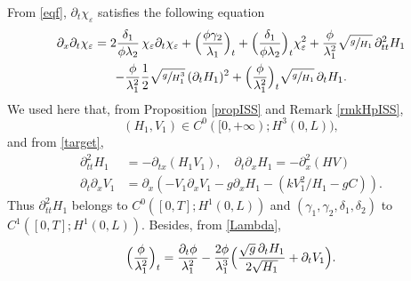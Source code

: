 \documentclass[11pt]{article}
\numberwithin{equation}{section}
\theoremstyle{definition}
\begin{document}
From \eqref{eqf},
$\partial_{t}\chi_{\varepsilon}$ satisfies the following equation
\begin{multline}
\label{eqdtf}
\partial_{x}\partial_{t}\chi_{\varepsilon}=2\frac{\delta_{1}}{\phi\lambda_{2}}\,\chi_{\varepsilon}\partial_{t}\chi_{\varepsilon}+\Bigl(\frac{\phi\gamma_{2}}{\lambda_{1}} \Bigr)_{t}+ \Bigl(\frac{\delta_{1}}{\phi\lambda_{2}} \Bigr)_{t}\chi^{2}_{\varepsilon}
+{\frac{\phi}{\lambda_{1}^{2}}}\sqrt{\sfrac{g}{H_{1}}}\,\partial_{tt}^{2} H_{1}\\
-{\frac{\phi}{\lambda_{1}^{2}}}\frac{1}{2}\sqrt{\sfrac{g}{H_{1}^{3}}}\,(\partial_{t}H_{1})^{2}+{\Bigl(\frac{\phi}{\lambda_{1}^{2}} \Bigr)_{t}\sqrt{\sfrac{g}{H_{1}}}\,\partial_{t} H_{1}}.
\end{multline}
We used here that, from Proposition \ref{propISS} and Remark \ref{rmkHpISS},
\[
(H_{1},V_{1})\in C^{0}([0,+\infty); H^{3}(0,L)),
\]
and from \eqref{target},
\begin{align*}
\partial_{tt}^{2}H_{1} &= -\partial_{tx}(H_{1}V_{1}), \quad\partial_{t}\partial_{x}H_{1}=-\partial_{x}^{2}(HV)\\
\tag*{and}
\partial_{t}\partial_{x}V_{1}&=\partial_{x}\left(-V_{1}\partial_{x}V_{1}-g\partial_{x}H_{1}-(kV_{1}^{2}/H_{1}-gC)\right).
\end{align*}
Thus $\partial_{tt}^{2}H_{1}$ belongs to $C^{0}([0,T]; H^{1}(0,L))$ and $(\gamma_{1}, \gamma_{2},\delta_{1},\delta_{2})$ to $C^{1}([0,T]; H^{1}(0,L))$. Besides, from \eqref{Lambda},
\begin{equation*}
\Bigl(\frac{\phi}{\lambda_{1}^{2}} \Bigr)_{t} = \frac{\partial_{t}\phi}{\lambda_{1}^{2}}-\frac{2\phi}{\lambda_{1}^{3}} \Bigl(\frac{{\sqrt{g}}\,\partial_{t}H_{1}}{2\sqrt{H_{1}}}+\partial_{t}V_{1} \Bigr).
\end{equation*}
\end{document}
